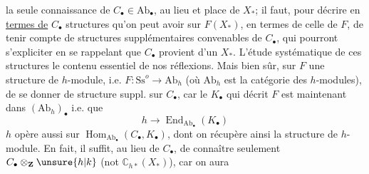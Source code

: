la seule connaissance de $C_\bullet\in\mathrm{Ab}_\bullet$, au lieu
et place de $X_*$; il faut, pour 
décrire en \uline{termes de} $C_\bullet$  structures
qu'on peut  avoir sur $F(X_*)$, en termes
de celle de $F$, de tenir compte de
structures supplémentaires convenables
de $C_\bullet$, qui pourront s'expliciter en se
rappelant que $C_\bullet$ provient d'un $X_*$. 
L'étude systématique de ces structures 
 
le contenu essentiel de nos réflexions.
Mais bien sûr,  
 sur $F$ une structure de
$h$-module, i.e. $F:\mathrm{Ss}^o\longrightarrow\mathrm{Ab}_h$
(où $\mathrm{Ab}_h$ est la catégorie des $h$-modules),
 de se donner de structure
suppl. sur $C_\bullet$, car  
 le $K_\bullet$ qui décrit $F$ est
maintenant dans $(\mathrm{Ab}_h)_\bullet$ i.e. que
\[
h\longrightarrow\operatorname{End}_{\mathrm{Ab}_\bullet}(K_\bullet)
\]
$h$ opère aussi sur $\operatorname{Hom}_{\mathrm{Ab}_\bullet}(C_\bullet,K_\bullet)$,
dont on récupère ainsi la structure
de $h$-module. En fait, il suffit,
au lieu de $C_\bullet$, de connaître
seulement  $C_\bullet\otimes_{\mathbf Z}\unsure{h|k}$ (not $\mathbb C_{h*}(X_*)$),
car on aura

